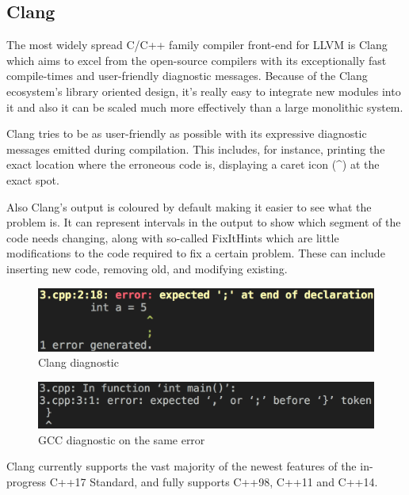 \subsection{Clang}
\par The most widely spread C/C++ family compiler front-end for LLVM is Clang which aims to excel from the open-source compilers with its exceptionally fast compile-times and user-friendly diagnostic messages\cite{clang_features}. Because of the Clang ecosystem's library oriented design, it's really easy to integrate new modules into it and also it can be scaled much more effectively than a large monolithic system. \medskip
\par Clang tries to be as user-friendly as possible with its expressive diagnostic messages emitted during compilation. This includes, for instance, printing the exact location where the erroneous code is, displaying a caret icon (\textasciicircum) at the exact spot. \medskip
\par Also Clang's output is coloured by default making it easier to see what the problem is. It can represent intervals in the output to show which segment of the code needs changing, along with so-called FixItHints which are little modifications to the code required to fix a certain problem. These can include inserting new code, removing old, and modifying existing.
\begin{figure}[h]
    \caption{Clang diagnostic}
    \includegraphics[scale = 0.42]{images/clang_diag}
\end{figure}
\begin{figure}[h]
    \caption{GCC diagnostic on the same error}
    \includegraphics[scale = 0.352]{images/gcc_diag}
\end{figure}
\par Clang currently supports the vast majority of the newest features of the in-progress C++17 Standard, and fully supports C++98, C++11 and C++14\cite{clang_language_support}.
